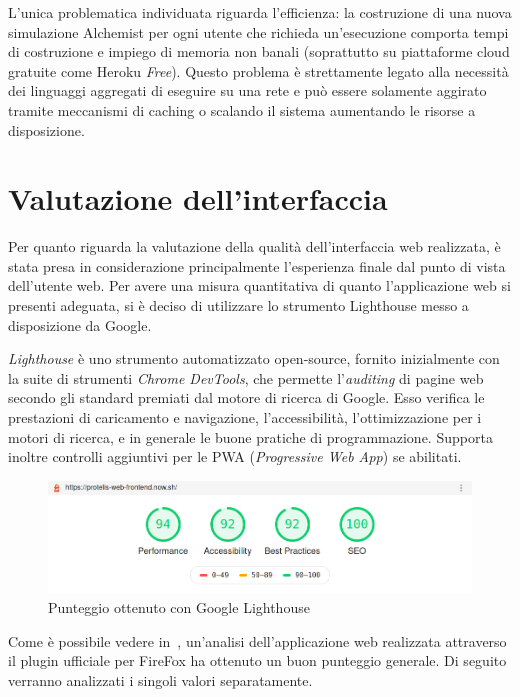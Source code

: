     L'unica problematica individuata riguarda l'efficienza:
    la costruzione di una nuova simulazione Alchemist per ogni utente che richieda un'esecuzione comporta tempi di costruzione e impiego di memoria non banali (soprattutto su piattaforme cloud gratuite come Heroku \emph{Free}).
    Questo problema è strettamente legato alla necessità dei linguaggi aggregati di eseguire su una rete e può essere solamente aggirato tramite meccanismi di caching o scalando il sistema aumentando le risorse a disposizione.

  \section{Valutazione dell'interfaccia}
    Per quanto riguarda la valutazione della qualità dell'interfaccia web realizzata, è stata presa in considerazione principalmente l'esperienza finale dal punto di vista dell'utente web.
    Per avere una misura quantitativa di quanto l'applicazione web si presenti adeguata, si è deciso di utilizzare lo strumento Lighthouse messo a disposizione da Google.

    \emph{Lighthouse} è uno strumento automatizzato open-source, fornito inizialmente con la suite di strumenti \emph{Chrome DevTools}, che permette l'\emph{auditing} di pagine web secondo gli standard premiati dal motore di ricerca di Google.
    Esso verifica le prestazioni di caricamento e navigazione, l'accessibilità, l'ottimizzazione per i motori di ricerca, e in generale le buone pratiche di programmazione.
    Supporta inoltre controlli aggiuntivi per le PWA (\emph{\emph{P}rogressive \emph{W}eb \emph{A}pp}) se abilitati.

    \begin{figure}[htbp]
      \centering
      \includegraphics[width=\textwidth]{res/tests/Screenshot_2020-03-04 Lighthouse Report Viewer.png}%
      \caption{Punteggio ottenuto con Google Lighthouse}%
      \label{fig:lighthouse}
    \end{figure}

    Come è possibile vedere in~, un'analisi dell'applicazione web realizzata attraverso il plugin ufficiale per FireFox ha ottenuto un buon punteggio generale.
    Di seguito verranno analizzati i singoli valori separatamente.

